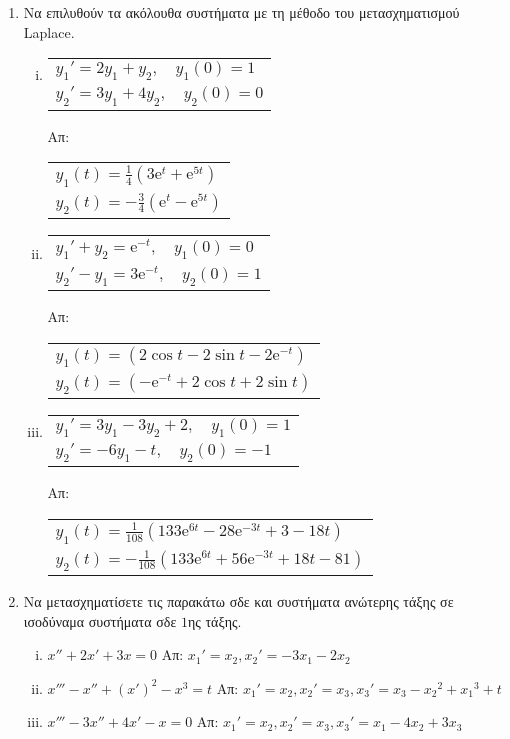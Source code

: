 \begin{enumerate}
  \item Να επιλυθούν τα ακόλουθα συστήματα με τη μέθοδο του μετασχηματισμού Laplace.
    \begin{enumerate}[i),itemsep=10pt]
      \item \begin{tabular}{l}
          $ y_{1}'=2 y_{1}+ y_{2}, \quad y_{1}(0)=1 $ \\
          $ y_{2}'= 3 y_{1}+ 4 y_{2}, \quad y_{2}(0)= 0 $ 
        \end{tabular} \hfill Απ: 
        \begin{tabular}{l}
          $ y_{1}(t) = \frac{1}{4} \left(3 \mathrm{e}^{t} + \mathrm{e}^{5t}\right) $ \\
          $ y_{2}(t) = -\frac{3}{4} \left( \mathrm{e}^{t} -  \mathrm{e}^{5t}\right) $ 
        \end{tabular}
      \item \begin{tabular}{l}
          $ y_{1}'+ y_{2} = \mathrm{e}^{-t}, \quad y_{1}(0)=0 $ \\
          $ y_{2}' - y_{1} =3\mathrm{e}^{-t}, \quad y_{2}(0)=1 $
        \end{tabular} \hfill Απ: 
        \begin{tabular}{l}
          $ y_{1}(t) = (2 \cos{t} - 2 \sin{t} -2 \mathrm{e}^{-t}) $ \\
          $ y_{2}(t) = ( - \mathrm{e}^{-t} + 2 \cos{t} + 2 \sin{t}) $
        \end{tabular}
      \item \begin{tabular}{l}
          $ y_{1}' = 3 y_{1}- 3 y_{2}+2, \quad y_{1}(0)=1 $ \\
          $ y_{2}' = -6 y_{1} - t, \quad y_{2}(0)=-1 $
        \end{tabular}\hfill \hfill Απ: 
        \begin{tabular}{l}
          $y_{1}(t)=\frac{1}{108}\left(133 \mathrm{e}^{6t} - 28 \mathrm{e}^{-3t} + 3 -18t
          \right)$ \\
          $y_{2}(t)=-\frac{1}{108}\left(133 \mathrm{e}^{6t} + 56 
          \mathrm{e}^{-3t} + 18t -81 \right)$ 
        \end{tabular} 
    \end{enumerate}

  \item Να μετασχηματίσετε τις παρακάτω σδε και συστήματα ανώτερης τάξης σε 
    ισοδύναμα συστήματα σδε $1$ης τάξης.

    \begin{enumerate}[i),itemsep=10pt]
      \item $x''+2x'+3x=0$ \hfill Απ: ${x_{1}}'= x_{2}, {x_{2}}'=-3x_{1}-2x_{2}$
      \item $x'''-x''+(x')^{2}-x^{3}=t$ 
        \hfill Απ: ${x_{1}}'= x_{2}, {x_{2}}'=x_{3},{x_{3}}'=x_{3}-{x_{2}}^{2}+
        {x_{1}}^{3}+t$
      \item $x'''-3x''+4x'-x=0$ 
        \hfill Απ: ${x_{1}}'= x_{2}, {x_{2}}'=x_{3}, {x_{3}}'=x_{1}-4x_{2}+3x_{3}$
    \end{enumerate}
\end{enumerate}



